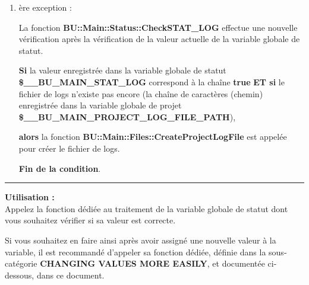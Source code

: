 \documentclass[a4paper,10pt]{article}
\begin{document}
\begin{justify}
    \begin{enumerate}
        \item
        {
            ère exception :

            \begin{justify}
                La fonction \textbf{\color{mauve}BU::Main::Status::CheckSTAT\_LOG} effectue une nouvelle vérification après la vérification de la valeur actuelle de la variable globale de statut.
            \end{justify}

            \begin{justify}
                \textbf{\color{brick}Si} la valeur enregistrée dans la variable globale de statut \textbf{\color{orange}\$\_\_BU\_MAIN\_STAT\_LOG} correspond à la chaîne \textbf{true} \textbf{\color{brick}ET si} le fichier de logs n'existe pas encore (la chaîne de caractères (chemin) enregistrée dans la variable globale de projet \textbf{\color{orange}\$\_\_BU\_MAIN\_PROJECT\_LOG\_FILE\_PATH}),
            \end{justify}

            \begin{justify}
                \textbf{\color{brick} alors} la fonction \textbf{\color{mauve}BU::Main::Files::CreateProjectLogFile} est appelée pour créer le fichier de logs.
            \end{justify}

            \begin{justify}
                \textbf{\color{brick}Fin de la condition}.
            \end{justify}
        }
    \end{enumerate}
\end{justify}


\par\noindent\rule{\textwidth}{0.4pt}

\begin{justify}
    \textbf{Utilisation :}\\[1\baselineskip]
    Appelez la fonction dédiée au traitement de la variable globale de statut dont vous souhaitez vérifier si sa valeur est correcte.
\end{justify}

\begin{justify}
    Si vous souhaitez en faire ainsi après avoir assigné une nouvelle valeur à la variable, il est recommandé d'appeler sa fonction dédiée, définie dans la sous-catégorie \textbf{\color{green}CHANGING VALUES MORE EASILY}, et documentée ci-dessous, dans ce document.
\end{justify}
\end{document}
